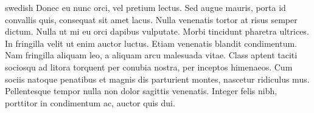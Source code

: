 \begin{foreignabstract}{swedish}
Donec eu nunc orci, vel pretium lectus. Sed augue mauris, porta id convallis quis, consequat sit amet lacus. Nulla venenatis tortor at risus semper dictum. Nulla ut mi eu orci dapibus vulputate. Morbi tincidunt pharetra ultrices. In fringilla velit ut enim auctor luctus. Etiam venenatis blandit condimentum. Nam fringilla aliquam leo, a aliquam arcu malesuada vitae. Class aptent taciti sociosqu ad litora torquent per conubia nostra, per inceptos himenaeos. Cum sociis natoque penatibus et magnis dis parturient montes, nascetur ridiculus mus. Pellentesque tempor nulla non dolor sagittis venenatis. Integer felis nibh, porttitor in condimentum ac, auctor quis dui.
\end{foreignabstract}